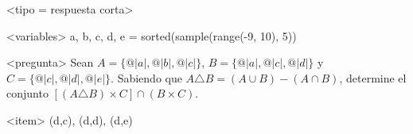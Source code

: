 <tipo = respuesta corta>

<variables>
a, b, c, d, e = sorted(sample(range(-9, 10), 5))

<pregunta>
Sean $A=\{@|a|, @|b|, @|c|\}$, $B=\{@|a|, @|c|, @|d|\}$ y $C=\{@|c|, @|d|, @|e|\}$. Sabiendo que $A\triangle B=(A\cup B)-(A\cap B)$, determine el conjunto $[(A\triangle B)\times C]\cap(B\times C)$.

<item>
{(d,c), (d,d), (d,e)}

